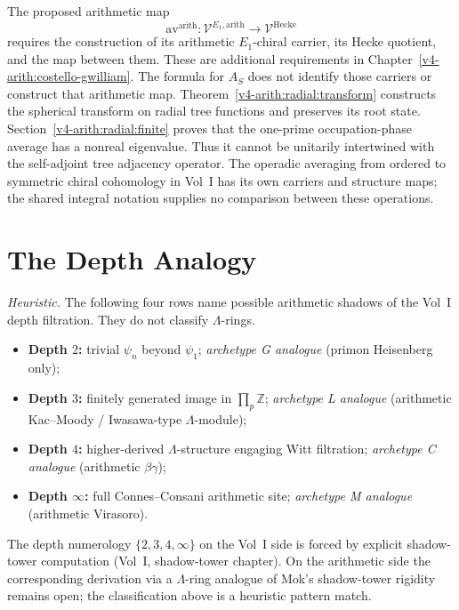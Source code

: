 \begin{warning}
\label{v4-arith:warning:averaging-is-plancherel}
The proposed arithmetic map
\[
 \mathrm{av}^{\mathrm{arith}}:
 \mathcal V^{E_1,\mathrm{arith}}\longrightarrow
 \mathcal V^{\mathrm{Hecke}}
\]
requires the construction of its arithmetic \(E_1\)-chiral carrier,
its Hecke quotient, and the map between them. These are additional
requirements in Chapter~\ref{v4-arith:costello-gwilliam}.
The formula for \(A_S\) does not identify those carriers or construct
that arithmetic map. Theorem~\ref{v4-arith:radial:transform} constructs the spherical
transform on radial tree functions and preserves its root state.
Section~\ref{v4-arith:radial:finite} proves that the one-prime
occupation-phase average has a nonreal eigenvalue. Thus it cannot
be unitarily intertwined with the self-adjoint tree adjacency operator. The operadic
averaging from ordered to symmetric chiral cohomology in Vol~I has
its own carriers and structure maps; the shared integral notation
supplies no comparison between these operations.
\end{warning}

\section{The Depth Analogy}
\label{v4-arith:construction:archetypes-heuristic}

\emph{Heuristic.} The following four rows name possible
arithmetic shadows of the Vol~I depth filtration. They do not classify
\(\Lambda\)-rings.
\begin{itemize}
\item \textbf{Depth \(2\):} trivial \(\psi_{n}\) beyond \(\psi_{1}\);
\emph{archetype G analogue} (primon Heisenberg only);
\item \textbf{Depth \(3\):} finitely generated image in
\(\prod_{p}\mathbb{Z}\); \emph{archetype L analogue} (arithmetic
Kac--Moody / Iwasawa-type \(\Lambda\)-module);
\item \textbf{Depth \(4\):} higher-derived \(\Lambda\)-structure
engaging Witt filtration; \emph{archetype C analogue}
(arithmetic \(\beta\gamma\));
\item \textbf{Depth \(\infty\):} full Connes--Consani arithmetic site;
\emph{archetype M analogue} (arithmetic Virasoro).
\end{itemize}

\begin{remark}
The depth numerology \(\{2,3,4,\infty\}\) on the Vol~I side is forced
by explicit shadow-tower computation (Vol~I, shadow-tower chapter). On
the arithmetic side the corresponding derivation via a
\(\Lambda\)-ring analogue of Mok's shadow-tower rigidity remains open; the classification
above is a heuristic pattern match.
\end{remark}

